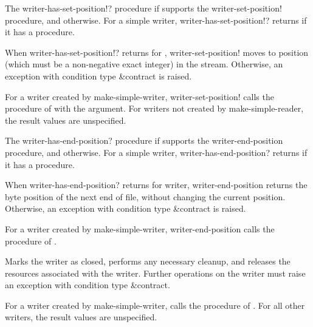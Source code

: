 \begin{entry}{%
}


The {\cf writer-has-set-position!?} procedure \schtrue{} if 
supports the {\cf writer-set-position!} procedure, and \schfalse{}
otherwise.  For a simple writer, {\cf writer-has-set-position!?}
returns \schtrue{} if it has a  procedure.

When {\cf writer-has-set-position!?} returns \schtrue{} for
, {\cf writer-set-position!}
moves to position  (which must be a non-negative
exact integer) in the stream.
Otherwise, an exception with condition type
{\cf\&contract} is raised.  

For a writer created by {\cf make-simple-writer}, {\cf
  writer-set-position!} calls the   procedure of
 with the  argument.  For writers not created by
{\cf make-simple-reader}, the result values are unspecified.
\end{entry}

\begin{entry}{%
}

The {\cf writer-has-end-position?} procedure \schtrue{} if 
supports the {\cf writer-end-position} procedure, and \schfalse{}
otherwise.  For a simple writer, {\cf writer-has-end-position?}
returns \schtrue{} if it has a  procedure.
  
When {\cf writer-has-end-position?} returns \schtrue{} for writer,
{\cf writer-end-position}
returns the byte position of the next end of file, without
changing the current position.  Otherwise, an exception with condition
type {\cf\&contract} is raised.
   
For a writer created by {\cf make-simple-writer}, {\cf
  writer-end-position} calls the  procedure of
.
\end{entry}

\begin{entry}{%
}
   
Marks the writer as closed, performs any necessary cleanup, and
releases the resources associated with the writer. Further operations
on the writer must raise an exception with condition type
{\cf\&contract}.
   
For a writer created by {\cf make-simple-writer}, calls the
 procedure of .  For all other writers,
the result values are unspecified.
\end{entry}

